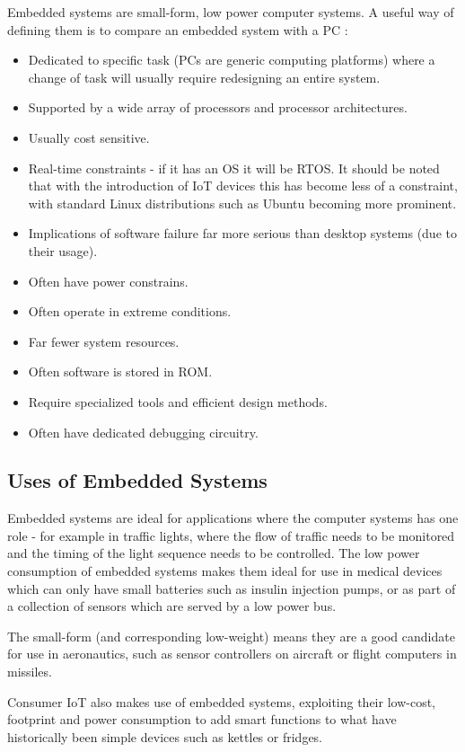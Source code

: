 Embedded systems are small-form, low power computer systems. A useful way of defining them is to compare an embedded system with a PC \cite{BergerArnold2002Esd:}:
\begin{itemize}
\item Dedicated to specific task (PCs are generic computing platforms) where a change of task will usually require redesigning an entire system.
\item Supported by a wide array of processors and processor architectures.
\item Usually cost sensitive.
\item Real-time constraints - if it has an OS it will be RTOS. It should be noted that with the introduction of IoT devices this has become less of a constraint, with standard Linux distributions such as Ubuntu becoming more prominent.
\item Implications of software failure far more serious than desktop systems (due to their usage).
\item Often have power constrains.
\item Often operate in extreme conditions.
\item Far fewer system resources.
\item Often software is stored in ROM.
\item Require specialized tools and efficient design methods.
\item Often have dedicated debugging circuitry.
\end{itemize}

\subsection{Uses of Embedded Systems}\label{usesEmbeddedSystems}

Embedded systems are ideal for applications where the computer systems has one role - for example in traffic lights, where the flow of traffic needs to be monitored and the timing of the light sequence needs to be controlled. The low power consumption of embedded systems makes them ideal for use in medical devices which can only have small batteries such as insulin injection pumps, or as part of a collection of sensors which are served by a low power bus.

The small-form (and corresponding low-weight) means they are a good candidate for use in aeronautics, such as sensor controllers on aircraft or flight computers in missiles.

Consumer IoT also makes use of embedded systems, exploiting their low-cost, footprint and power consumption to add smart functions to what have historically been simple devices such as kettles or fridges.

